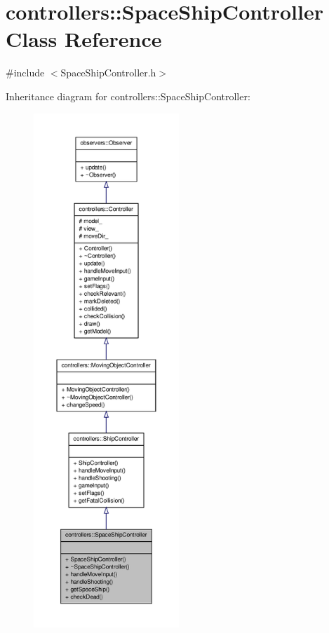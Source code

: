 \hypertarget{classcontrollers_1_1SpaceShipController}{\section{controllers\-:\-:\-Space\-Ship\-Controller \-Class \-Reference}
\label{d9/d89/classcontrollers_1_1SpaceShipController}
}


{\ttfamily \#include $<$\-Space\-Ship\-Controller.\-h$>$}



\-Inheritance diagram for controllers\-:\-:\-Space\-Ship\-Controller\-:\nopagebreak
\begin{figure}[H]
\begin{center}
\leavevmode
\includegraphics[height=550pt]{d7/d90/classcontrollers_1_1SpaceShipController__inherit__graph}
\end{center}
\end{figure}


